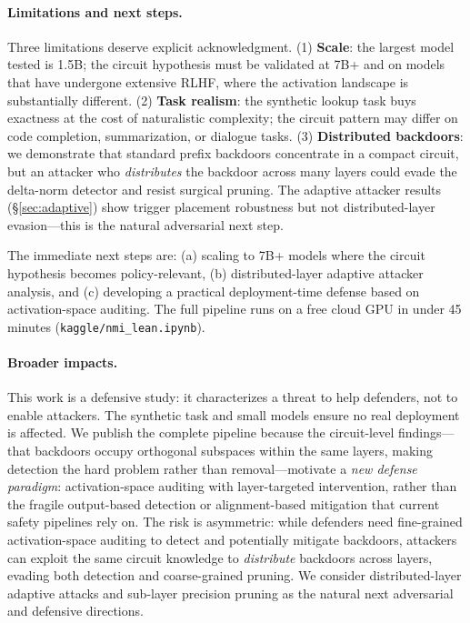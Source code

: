 \documentclass[11pt]{article}
\begin{document}
\paragraph{Limitations and next steps.}
Three limitations deserve explicit acknowledgment. (1) \textbf{Scale}: the
largest model tested is 1.5B; the circuit hypothesis must be validated at
7B+ and on models that have undergone extensive RLHF, where the activation
landscape is substantially different. (2) \textbf{Task realism}: the
synthetic lookup task buys exactness at the cost of naturalistic complexity;
the circuit pattern may differ on code completion, summarization, or
dialogue tasks. (3) \textbf{Distributed backdoors}: we demonstrate that
standard prefix backdoors concentrate in a compact circuit, but an attacker
who \emph{distributes} the backdoor across many layers could evade the
delta-norm detector and resist surgical pruning. The adaptive attacker
results (\S\ref{sec:adaptive}) show trigger placement robustness but not
distributed-layer evasion---this is the natural adversarial next step.

The immediate next steps are: (a) scaling to 7B+ models where the circuit
hypothesis becomes policy-relevant, (b) distributed-layer adaptive attacker
analysis, and (c) developing a practical deployment-time defense based on
activation-space auditing. The full pipeline runs on a free cloud GPU in
under 45 minutes (\texttt{kaggle/nmi\_lean.ipynb}).

\paragraph{Broader impacts.}
This work is a defensive study: it characterizes a threat to help defenders,
not to enable attackers. The synthetic task and small models ensure no real
deployment is affected. We publish the complete pipeline because the
circuit-level findings---that backdoors occupy orthogonal subspaces within
the same layers, making detection the hard problem rather than
removal---motivate a \emph{new defense paradigm}: activation-space auditing with layer-targeted intervention,
rather than the fragile output-based detection or alignment-based
mitigation that current safety pipelines rely on. The risk is asymmetric:
while defenders need fine-grained activation-space auditing to detect and
potentially mitigate backdoors, attackers can exploit the same circuit
knowledge to \emph{distribute} backdoors across layers, evading both
detection and coarse-grained pruning. We consider distributed-layer
adaptive attacks and sub-layer precision pruning as the natural next
adversarial and defensive directions.
\end{document}
